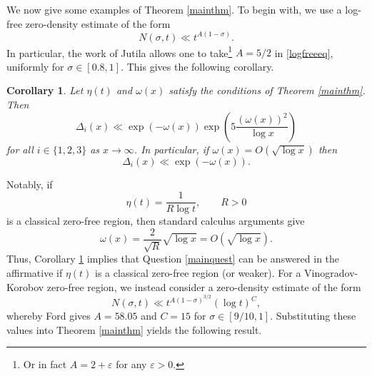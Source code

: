 \documentclass[reqno]{amsart}
\newtheorem{corollary}[theorem]{Corollary}
\numberwithin{equation}{section}
\theoremstyle{remark}
\begin{document}
We now give some examples of Theorem \ref{mainthm}. To begin with, we use a log-free zero-density estimate of the form
\begin{equation}\label{logfreeeq}
    N(\sigma,t)\ll t^{A(1-\sigma)}.
\end{equation}
In particular, the work of Jutila \cite[Theorem 1]{jutila1977linnik} allows one to take\footnote{Or in fact $A=2+\varepsilon$ for any $\varepsilon>0$.} $A=5/2$ in \eqref{logfreeeq}, uniformly for $\sigma\in[0.8,1]$. This gives the following corollary.

\begin{corollary}\label{logfreecor}
    Let $\eta(t)$ and $\omega(x)$ satisfy the conditions of Theorem \ref{mainthm}. Then
    \begin{equation*}
        \Delta_i(x)\ll\exp(-\omega(x))\exp\left(5\frac{(\omega(x))^2}{\log x}\right)
    \end{equation*}
    for all $i\in\{1,2,3\}$ as $x\to\infty$. In particular, if $\omega(x)=O(\sqrt{\log x})$ then
    \begin{equation}\label{logfreeasym}
        \Delta_i(x)\ll\exp(-\omega(x)).
    \end{equation}
\end{corollary}
Notably, if
\begin{equation*}
    \eta(t)=\frac{1}{R\log t},\qquad R>0
\end{equation*}
is a classical zero-free region, then standard calculus arguments give 
\begin{equation*}
    \omega(x)=\frac{2}{\sqrt{R}}\sqrt{\log x}=O(\sqrt{\log x}).
\end{equation*}
Thus, Corollary \ref{logfreecor} implies that Question \ref{mainquest} can be answered in the affirmative if $\eta(t)$ is a classical zero-free region (or weaker). For a Vinogradov-Korobov zero-free region, we instead consider a zero-density estimate of the form
\begin{equation}\label{vkzeroden}
    N(\sigma,t)\ll t^{A(1-\sigma)^{3/2}}(\log t)^C,
\end{equation}
whereby Ford \cite[p.~2]{ford2002vinogradov} gives $A=58.05$ and $C=15$ for $\sigma\in[9/10,1]$. Substituting these values into Theorem \ref{mainthm} yields the following result.
\end{document}
